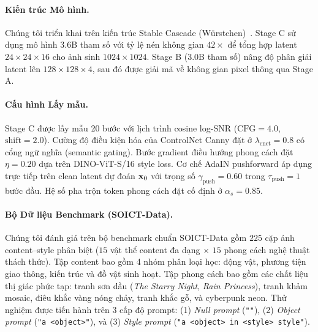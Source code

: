 \documentclass[runningheads]{llncs}
\begin{document}
\paragraph{Kiến trúc Mô hình.}
Chúng tôi triển khai \method trên kiến trúc Stable Cascade (W{\"u}rstchen)~\cite{wuerstchen}. Stage C sử dụng mô hình 3.6B tham số với tỷ lệ nén không gian $42\times$ để tổng hợp latent $24 \times 24 \times 16$ cho ảnh sinh $1024 \times 1024$. Stage B (3.0B tham số) nâng độ phân giải latent lên $128 \times 128 \times 4$, sau đó được giải mã về không gian pixel thông qua Stage A.

\paragraph{Cấu hình Lấy mẫu.}
Stage C được lấy mẫu 20 bước với lịch trình cosine log-SNR ($\text{CFG} = 4.0$, $\text{shift} = 2.0$). Cường độ điều kiện hóa của ControlNet Canny đặt ở $\lambda_{\text{cnet}} = 0.8$ có cổng ngữ nghĩa (semantic gating). Bước gradient điều hướng phong cách đặt $\eta = 0.20$ dựa trên DINO-ViT-S/16 style loss. Cơ chế AdaIN pushforward áp dụng trực tiếp trên clean latent dự đoán $\mathbf{x}_0$ với trọng số $\gamma_{\text{push}} = 0.60$ trong $\tau_{\text{push}} = 1$ bước đầu. Hệ số pha trộn token phong cách đặt cố định ở $\alpha_s = 0.85$.

\paragraph{Bộ Dữ liệu Benchmark (SOICT-Data).}
Chúng tôi đánh giá trên bộ benchmark chuẩn SOICT-Data gồm $225$ cặp ảnh content--style phân biệt ($15$ vật thể content đa dạng $\times$ $15$ phong cách nghệ thuật thách thức). Tập content bao gồm 4 nhóm phân loại học: động vật, phương tiện giao thông, kiến trúc và đồ vật sinh hoạt. Tập phong cách bao gồm các chất liệu thị giác phức tạp: tranh sơn dầu (\textit{The Starry Night}, \textit{Rain Princess}), tranh khảm mosaic, điêu khắc vàng nóng chảy, tranh khắc gỗ, và cyberpunk neon. Thử nghiệm được tiến hành trên 3 cấp độ prompt: (1) \textit{Null prompt} (\texttt{""}), (2) \textit{Object prompt} (\texttt{"a <object>"}), và (3) \textit{Style prompt} (\texttt{"a <object> in <style> style"}).
\end{document}
